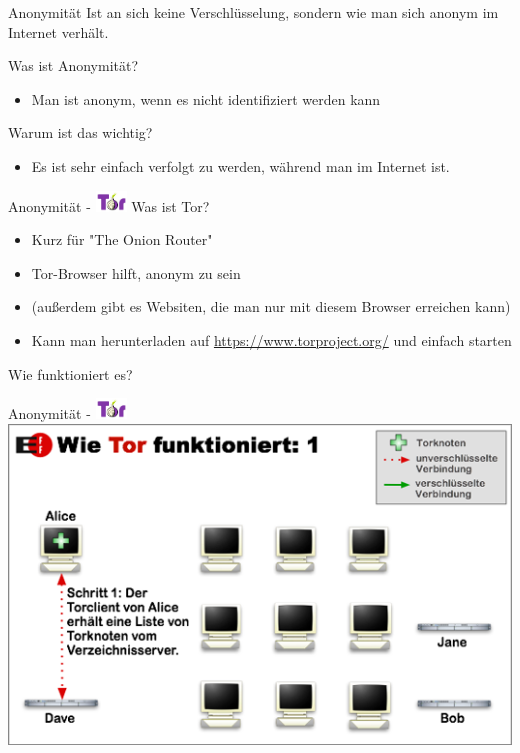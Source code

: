 \documentclass{beamer}
\begin{document}
\begin{frame}{Anonymität}
	Ist an sich keine Verschlüsselung, sondern wie man sich anonym im Internet verhält.
	\\\hspace{1cm}
	
	Was ist Anonymität?
	\begin{itemize}
		\item Man ist anonym, wenn es nicht identifiziert werden kann
	\end{itemize}
	
	Warum ist das wichtig?
	\begin{itemize}
		\item Es ist sehr einfach verfolgt zu werden, während man im Internet ist. 
	\end{itemize}
\end{frame}

\begin{frame}{Anonymität - \includegraphics[align=c,height=1.5em]{tor.jpg}}
	Was ist Tor?
	\begin{itemize}
		\item Kurz für "The Onion Router"
		\item Tor-Browser hilft, anonym zu sein
		\item (außerdem gibt es Websiten, die man nur mit diesem Browser erreichen kann)
		\item Kann man herunterladen auf \url{https://www.torproject.org/} und einfach starten
	\end{itemize}
	\hspace{1cm}
	
	Wie funktioniert es?
\end{frame}

\begin{frame}{Anonymität - \includegraphics[align=c,height=1.5em]{tor.jpg}}
    \centering\includegraphics[height=0.7\textheight]{tor1.png}
\end{frame}
\end{document}
